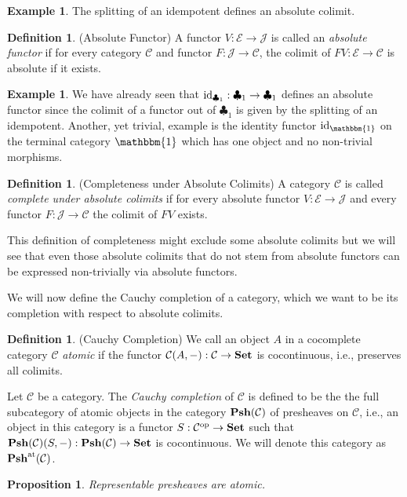 \documentclass[12pt,oneside,reqno,a4paper]{article}
\newtheorem{proposition}[theorem]{Proposition}
\theoremstyle{definition}
\newtheorem{definition}[theorem]{Definition}
\newtheorem{example}[theorem]{Example}
\newcommand{\op}{^\textup{op}}
\newcommand{\Set}{\textbf{\textup{Set}}}
\newcommand{\Psh}[1]{\textbf{\textup{Psh}}(#1)}
\newcommand{\Pshat}[1]{\textbf{\textup{Psh}}^\textup{at}(#1)}
\newcommand{\clb}{\clubsuit}
\newcommand{\id}{\textup{id}}
\newcommand{\C}{\mathcal{C}}
\newcommand{\E}{\mathcal{E}}
\newcommand{\J}{\mathcal{J}}
\begin{document}
\begin{example}
The splitting of an idempotent defines an absolute colimit.
\end{example}

\begin{definition}{(Absolute Functor)}
A functor $V:\E\to\J$ is called an \textit{absolute functor} if for every category $\C$ and functor $F:\J\to\C$, the colimit of $FV:\E\to\C$ is absolute if it exists. 
\end{definition}

\begin{example}
We have already seen that $\id_{\clb_1}:\clb_1\to\clb_1$ defines an absolute functor since the colimit of a functor out of $\clb_1$ is given by the splitting of an idempotent. Another, yet trivial, example is the identity functor $\id_\mathbbm{1}$ on the terminal category $\mathbbm{1}$ which has one object and no non-trivial morphisms.
\end{example}

\begin{definition}{(Completeness under Absolute Colimits)}
A category $\C$ is called \textit{complete under absolute colimits} if for every absolute functor $V:\E\to\J$ and every functor $F:\J\to\C$ the colimit of $FV$ exists.
\end{definition}

This definition of completeness might exclude some absolute colimits but we will see that even those absolute colimits that do not stem from absolute functors can be expressed non-trivially via absolute functors.

We will now define the Cauchy completion of a category, which we want to be its completion with respect to absolute colimits.

\begin{definition}{(Cauchy Completion)}
We call an object $A$ in a cocomplete category $\C$ \textit{atomic} if the functor $\C(A,-):\C\to\Set$ is cocontinuous, i.e., preserves all colimits.

Let $\C$ be a category. The \textit{Cauchy completion} of $\C$ is defined to be the the full subcategory of atomic objects in the category $\Psh{\C}$ of presheaves on $\C$, i.e., an object in this category is a functor $S:\C\op\to\Set$ such that $\Psh{\C}(S,-):\Psh{\C}\to\Set$ is cocontinuous. We will denote this category as $\Pshat{\C}$.
\end{definition}

\begin{proposition} \label{repato}
Representable presheaves are atomic.
\end{proposition}
\end{document}
